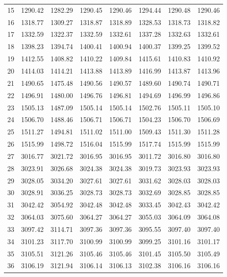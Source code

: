 \documentclass[10pt,oneside]{article}
\begin{document}
\begin{table}[h!]
\begin{tabular}{cccccccc}
15 &   1290.42 & 1282.29 & 1290.45 &    1290.46 &      1294.44 & 1290.48 &   1290.46 \\
16 &   1318.77 & 1309.27 & 1318.87 &    1318.89 &      1328.53 & 1318.73 &   1318.82 \\
17 &   1332.59 & 1322.37 & 1332.59 &    1332.61 &      1337.28 & 1332.63 &   1332.61 \\
18 &   1398.23 & 1394.74 & 1400.41 &    1400.94 &      1400.37 & 1399.25 &   1399.52 \\
19 &   1412.55 & 1408.82 & 1410.22 &    1409.84 &      1415.61 & 1410.83 &   1410.92 \\
20 &   1414.03 & 1414.21 & 1413.88 &    1413.89 &      1416.99 & 1413.87 &   1413.96 \\
21 &   1490.65 & 1475.48 & 1490.56 &    1490.57 &      1489.60 & 1490.74 &   1490.71 \\
22 &   1496.91 & 1480.00 & 1496.76 &    1496.81 &      1494.69 & 1496.99 &   1496.86 \\
23 &   1505.13 & 1487.09 & 1505.14 &    1505.14 &      1502.76 & 1505.11 &   1505.10 \\
24 &   1506.70 & 1488.46 & 1506.71 &    1506.71 &      1504.23 & 1506.70 &   1506.69 \\
25 &   1511.27 & 1494.81 & 1511.02 &    1511.00 &      1509.43 & 1511.30 &   1511.28 \\
26 &   1515.99 & 1498.72 & 1516.04 &    1515.99 &      1517.74 & 1515.99 &   1515.99 \\
27 &   3016.77 & 3021.72 & 3016.95 &    3016.95 &      3011.72 & 3016.80 &   3016.80 \\
28 &   3023.91 & 3026.68 & 3024.38 &    3024.38 &      3019.73 & 3023.93 &   3023.93 \\
29 &   3028.05 & 3034.20 & 3027.61 &    3027.61 &      3031.62 & 3028.03 &   3028.03 \\
30 &   3028.91 & 3036.25 & 3028.73 &    3028.73 &      3032.69 & 3028.85 &   3028.85 \\
31 &   3042.42 & 3054.92 & 3042.48 &    3042.48 &      3033.45 & 3042.43 &   3042.42 \\
32 &   3064.03 & 3075.60 & 3064.27 &    3064.27 &      3055.03 & 3064.09 &   3064.08 \\
33 &   3097.42 & 3114.71 & 3097.36 &    3097.36 &      3095.55 & 3097.40 &   3097.40 \\
34 &   3101.23 & 3117.70 & 3100.99 &    3100.99 &      3099.25 & 3101.16 &   3101.17 \\
35 &   3105.51 & 3121.26 & 3105.46 &    3105.46 &      3101.45 & 3105.50 &   3105.49 \\
36 &   3106.19 & 3121.94 & 3106.14 &    3106.13 &      3102.38 & 3106.16 &   3106.16 \\
\bottomrule
\end{tabular}
\end{table}
\end{document}
